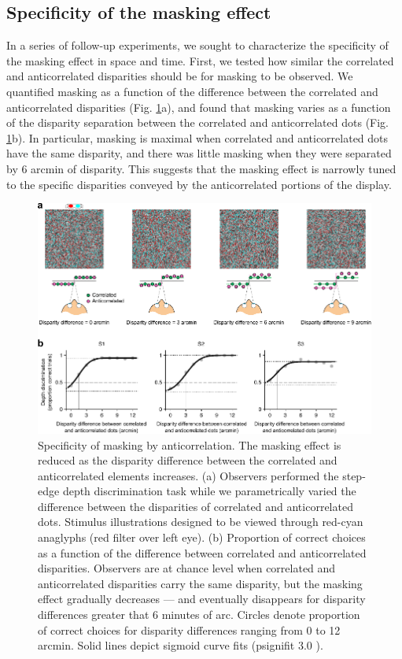 \subsection{Specificity of the masking effect}
In a series of follow-up experiments, we sought to characterize the specificity of the masking effect in space and time. First, we tested how similar the correlated and anticorrelated disparities should be for masking to be observed. We quantified masking as a function of the difference between the correlated and anticorrelated disparities (Fig. \ref{fig:c2f3}a), and found that masking varies as a function of the disparity separation between the correlated and anticorrelated dots (Fig. \ref{fig:c2f3}b). In particular, masking is maximal when correlated and anticorrelated dots have the same disparity, and there was little masking when they were separated by 6 arcmin of disparity. This suggests that the masking effect is narrowly tuned to the specific disparities conveyed by the anticorrelated portions of the display.

\begin{figure}
  \centering
  \includegraphics{Fig3}
  \caption[Specificity of masking by anticorrelation.]{Specificity of masking by anticorrelation. The masking effect is reduced as the disparity difference between the correlated and anticorrelated elements increases. (a) Observers performed the step-edge depth discrimination task while we parametrically varied the difference between the disparities of correlated and anticorrelated dots. Stimulus illustrations designed to be viewed through red-cyan anaglyphs (red filter over left eye). (b) Proportion of correct choices as a function of the difference between correlated and anticorrelated disparities. Observers are at chance level when correlated and anticorrelated disparities carry the same disparity, but the masking effect gradually decreases --- and eventually disappears for disparity differences greater that 6 minutes of arc. Circles denote proportion of correct choices for disparity differences ranging from 0 to 12 arcmin. Solid lines depict sigmoid curve fits (psignifit 3.0 \cite{Frund:2011aa}).}
  \label{fig:c2f3}
\end{figure}


